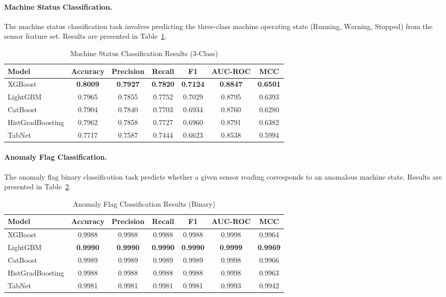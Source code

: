 \paragraph{Machine Status Classification.} The machine status classification task involves predicting the three-class machine operating state (Running, Warning, Stopped) from the sensor feature set. Results are presented in Table~\ref{tab:cls_stat}.
\begin{table}[!htbp]
\centering
\caption{Machine Status Classification Results (3-Class)}
\label{tab:cls_stat}
\begin{tabular}{lcccccc}
\hline
\textbf{Model} & \textbf{Accuracy} & \textbf{Precision} & \textbf{Recall} & \textbf{F1} & \textbf{AUC-ROC} & \textbf{MCC} \\
\hline
XGBoost              & \textbf{0.8009} & \textbf{0.7927} & \textbf{0.7820} & \textbf{0.7124} & \textbf{0.8847} & \textbf{0.6501} \\
LightGBM             & 0.7965 & 0.7855 & 0.7752 & 0.7029 & 0.8795 & 0.6393 \\
CatBoost             & 0.7904 & 0.7840 & 0.7703 & 0.6934 & 0.8760 & 0.6280 \\
HistGradBoosting     & 0.7962 & 0.7858 & 0.7727 & 0.6960 & 0.8791 & 0.6382 \\
TabNet               & 0.7717 & 0.7587 & 0.7444 & 0.6623 & 0.8538 & 0.5994 \\
\hline
\end{tabular}
\end{table}
\paragraph{Anomaly Flag Classification.} The anomaly flag binary classification task predicts whether a given sensor reading corresponds to an anomalous machine state. Results are presented in Table~\ref{tab:cls_anom}.
\begin{table}[!htbp]
\centering
\caption{Anomaly Flag Classification Results (Binary)}
\label{tab:cls_anom}
\begin{tabular}{lcccccc}
\hline
\textbf{Model} & \textbf{Accuracy} & \textbf{Precision} & \textbf{Recall} & \textbf{F1} & \textbf{AUC-ROC} & \textbf{MCC} \\
\hline
XGBoost              & 0.9988 & 0.9988 & 0.9988 & 0.9988 & 0.9998 & 0.9964 \\
LightGBM             & \textbf{0.9990} & \textbf{0.9990} & \textbf{0.9990} & \textbf{0.9990} & \textbf{0.9999} & \textbf{0.9969} \\
CatBoost             & 0.9989 & 0.9989 & 0.9989 & 0.9989 & 0.9998 & 0.9966 \\
HistGradBoosting     & 0.9988 & 0.9988 & 0.9988 & 0.9988 & 0.9998 & 0.9963 \\
TabNet               & 0.9981 & 0.9981 & 0.9981 & 0.9981 & 0.9993 & 0.9942 \\
\hline
\end{tabular}
\end{table}

